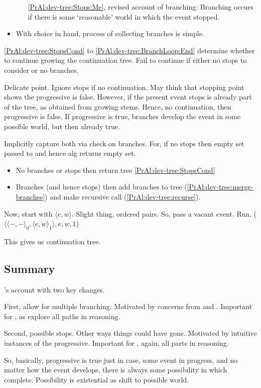 \begin{note}
\begin{itemize}
\begin{itemize}
      \autoref{PrAl:dev-tree:Stops:Me}, revised account of branching:
      Branching occurs if there is some `reasonable' world in which the event stopped.
    \end{itemize}
  \item
    With choice in hand, process of collecting branches is simple.
  \end{itemize}

  \autoref{PrAl:dev-tree:StopsCond} to \autoref{PrAl:dev-tree:BranchLoop:End} determine whether to continue growing the continuation tree.
  Fail to continue if either no stops to consider or no branches.

  Delicate point.
  Ignore stops if no continuation.
  May think that stopping point shows the progressive is false.
  However, if the present event stops is already part of the tree, as obtained from growing stems.
  Hence, no continuation, then progressive is false.
  If progressive is true, branches develop the event in some possible world, but then already true.

  Implicitly capture both via check on branches.
  For, if no stops then empty set passed to and hence alg returns empty set.

  \begin{itemize}
  \item
    No branches or stops then return tree \autoref{PrAl:dev-tree:StopsCond}
  \item
    Branches (and hence stops) then add branches to tree (\autoref{PrAl:dev-tree:merge-branches}) and make recursive call (\autoref{PrAl:dev-tree:recurse}).
  \end{itemize}

  Now, start with \(\langle e,w \rangle\).
  Slight thing, ordered pairs.
  So, pass a vacant event.
  Run, \AlgDevelopTree{}(\(\langle \langle -,- \rangle_{0}, \langle e,w \rangle_{1} \rangle, e, w, 1\))

  This gives us continuation tree.
\end{note}

\subsection{Summary}

\begin{note}
  \citeauthor{Landman:1992wh}'s account with two key changes.

  First, allow for multiple branching.
  Motivated by concerns from \citeauthor{Bonomi:1997uq} and \citeauthor{Szabo:2004ul}.
  Important for , as explore all paths in reasoning.

  Second, possible stops.
  Other ways things could have gone.
  Motivated by intuitive instances of the progressive.
  Important for , again, all parts in reasoning.

  So, basically, progressive is true just in case, some event in progress, and no matter how the event develops, there is always some possibility in which complete.
  Possibility is existential as shift to possible world.
\end{note}

